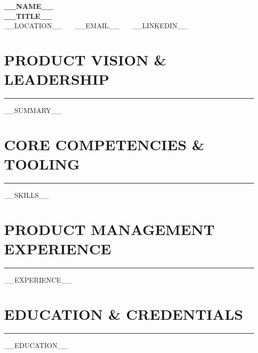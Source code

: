 \documentclass[10pt,letterpaper]{article}
\begin{document}
\begin{center}
    {\LARGE \textbf{\color{darkgray} __NAME__}} \\ \vspace{2pt}
    {\large \textbf{__TITLE__}} \\ \vspace{2pt}
    \small __LOCATION__ \ \textbar\ \ __EMAIL__ \ \textbar\ \ __LINKEDIN__
\end{center}

\vspace{-4pt}
\section*{\large\bfseries\color{primary}\uppercase{Product Vision \& Leadership}}
\vspace{-4pt}\rule{\textwidth}{0.8pt}\vspace{3pt}
__SUMMARY__

\section*{\large\bfseries\color{primary}\uppercase{Core Competencies \& Tooling}}
\vspace{-4pt}\rule{\textwidth}{0.8pt}\vspace{3pt}
\small
__SKILLS__

\section*{\large\bfseries\color{primary}\uppercase{Product Management Experience}}
\vspace{-4pt}\rule{\textwidth}{0.8pt}\vspace{3pt}
\small
__EXPERIENCE__

\section*{\large\bfseries\color{primary}\uppercase{Education \& Credentials}}
\vspace{-4pt}\rule{\textwidth}{0.8pt}\vspace{3pt}
\small
__EDUCATION__
\end{document}
